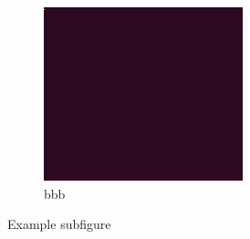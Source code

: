 \documentclass[11pt]{article}
\begin{document}
\begin{figure}
\begin{subfigure}[b]{0.3\textwidth}
        \includegraphics[width=\textwidth]{example-image.png}
        \caption{bbb}
        \label{fig:subfig2}
    \end{subfigure}
    \caption{Example subfigure}
    \label{fig:subfig}
\end{figure}
\end{document}
